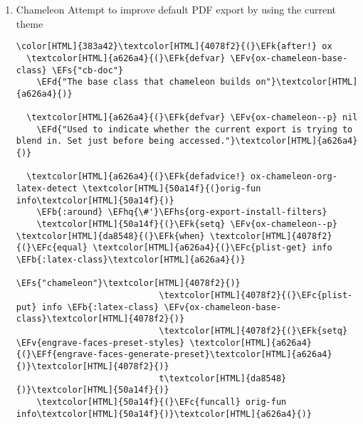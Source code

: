 \documentclass{scrartcl}
\newcommand{\EFk}[1]{\textcolor{EFk}{#1}} %
\newcommand{\EFd}[1]{\textcolor{EFd}{\textit{#1}}} %
\newcommand{\EFs}[1]{\textcolor{EFs}{#1}} %
\newcommand{\EFb}[1]{\textcolor{EFb}{#1}} %
\newcommand{\EFc}[1]{\textcolor{EFc}{#1}} %
\newcommand{\EFv}[1]{\textcolor{EFv}{#1}} %
\newcommand{\EFf}[1]{\textcolor{EFf}{#1}} %
\newcommand{\EFhq}[1]{\textcolor{EFhq}{#1}} %
\newcommand{\EFhs}[1]{\textcolor{EFhs}{#1}} %
\begin{document}
\begin{enumerate}
\begin{Code}
\begin{Verbatim}[]
\textcolor[HTML]{4078f2}{(}\EFk{defadvice!} org-latex-example-block-engraved \textcolor[HTML]{a626a4}{(}orig-fn example-block contents info\textcolor[HTML]{a626a4}{)}
  \EFd{"Like `}\textcolor[HTML]{b751b6}{\textit{org-latex-example-block}}\EFd{', but supporting an engraved backend"}
  \EFb{:around} \EFhq{\#'}\EFhs{org-latex-example-block}
  \textcolor[HTML]{a626a4}{(}\EFk{let} \textcolor[HTML]{50a14f}{(}\textcolor[HTML]{da8548}{(}output-block \textcolor[HTML]{4078f2}{(}\EFc{funcall} orig-fn example-block contents info\textcolor[HTML]{4078f2}{)}\textcolor[HTML]{da8548}{)}\textcolor[HTML]{50a14f}{)}
    \textcolor[HTML]{50a14f}{(}\EFk{if} \textcolor[HTML]{da8548}{(}\EFc{eq} \EFhq{'}\EFhs{engraved} \textcolor[HTML]{4078f2}{(}\EFc{plist-get} info \EFb{:latex-listings}\textcolor[HTML]{4078f2}{)}\textcolor[HTML]{da8548}{)}
        \textcolor[HTML]{da8548}{(}\EFc{format} \EFs{"\char92{}\char92{}begin\{Code\}[alt]\char92{}n\%s\char92{}n\char92{}\char92{}end\{Code\}"} output-block\textcolor[HTML]{da8548}{)}
      output-block\textcolor[HTML]{50a14f}{)}\textcolor[HTML]{a626a4}{)}\textcolor[HTML]{4078f2}{)}
\end{Verbatim}
\end{Code}

\item Chameleon
\label{sec:org7d16916}
Attempt to improve default PDF export by using the current theme
\begin{Code}
\begin{Verbatim}[]
\color[HTML]{383a42}\textcolor[HTML]{4078f2}{(}\EFk{after!} ox
  \textcolor[HTML]{a626a4}{(}\EFk{defvar} \EFv{ox-chameleon-base-class} \EFs{"cb-doc"}
    \EFd{"The base class that chameleon builds on"}\textcolor[HTML]{a626a4}{)}

  \textcolor[HTML]{a626a4}{(}\EFk{defvar} \EFv{ox-chameleon--p} nil
    \EFd{"Used to indicate whether the current export is trying to blend in. Set just before being accessed."}\textcolor[HTML]{a626a4}{)}

  \textcolor[HTML]{a626a4}{(}\EFk{defadvice!} ox-chameleon-org-latex-detect \textcolor[HTML]{50a14f}{(}orig-fun info\textcolor[HTML]{50a14f}{)}
    \EFb{:around} \EFhq{\#'}\EFhs{org-export-install-filters}
    \textcolor[HTML]{50a14f}{(}\EFk{setq} \EFv{ox-chameleon--p} \textcolor[HTML]{da8548}{(}\EFk{when} \textcolor[HTML]{4078f2}{(}\EFc{equal} \textcolor[HTML]{a626a4}{(}\EFc{plist-get} info \EFb{:latex-class}\textcolor[HTML]{a626a4}{)}
                                       \EFs{"chameleon"}\textcolor[HTML]{4078f2}{)}
                            \textcolor[HTML]{4078f2}{(}\EFc{plist-put} info \EFb{:latex-class} \EFv{ox-chameleon-base-class}\textcolor[HTML]{4078f2}{)}
                            \textcolor[HTML]{4078f2}{(}\EFk{setq} \EFv{engrave-faces-preset-styles} \textcolor[HTML]{a626a4}{(}\EFf{engrave-faces-generate-preset}\textcolor[HTML]{a626a4}{)}\textcolor[HTML]{4078f2}{)}
                            t\textcolor[HTML]{da8548}{)}\textcolor[HTML]{50a14f}{)}
    \textcolor[HTML]{50a14f}{(}\EFc{funcall} orig-fun info\textcolor[HTML]{50a14f}{)}\textcolor[HTML]{a626a4}{)}


\end{Verbatim}
\end{Code}
\end{enumerate}
\end{document}

